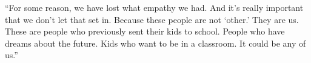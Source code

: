 

``For some reason, we have lost what empathy we had.  And it's really
important that we don't let that set in.  Because these people are not
`other.'  They are us.  These are people who previously sent their
kids to school.  People who have dreams about the future.  Kids who
want to be in a classroom.  It could be any of us.''

\bigskip


\smallskip


\bye
